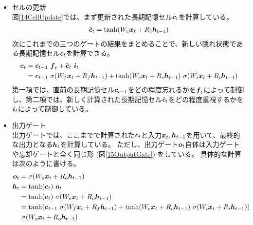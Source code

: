 \begin{itemize}
  \item セルの更新\\
  図\ref{14CellUpdate}では、まず更新された長期記憶セル$\tilde{{\mbox{\boldmath{$c$}}}}_t$を計算している。
\begin{equation}
 \begin{split}
  \tilde{{\mbox{\boldmath{$c$}}}}_t = \tanh (W_c {\mbox{\boldmath{$x$}}}_t + R_c {\mbox{\boldmath{$h$}}}_{t-1})
 \end{split}
\end{equation} 
  次にこれまでの三つのゲートの結果をまとめることで、新しい隠れ状態である長期記憶セル${\mbox{\boldmath{$c$}}}_{t}$を計算できる。
\begin{equation}
 \begin{split}
  {\mbox{\boldmath{$c$}}}_{t} 
  &= {\mbox{\boldmath{$c$}}}_{t-1} \  {\mbox{\boldmath{$f$}}}_{t} + \tilde{\mbox{\boldmath{$c$}}}_{t}\ {\mbox{\boldmath{$i$}}}_{t}\\
  &= {\mbox{\boldmath{$c$}}}_{t-1} \  \sigma (W_f {\mbox{\boldmath{$x$}}}_t + R_f {\mbox{\boldmath{$h$}}}_{t-1}) 
  + \tanh (W_c {\mbox{\boldmath{$x$}}}_t + R_c {\mbox{\boldmath{$h$}}}_{t-1}) \  \sigma (W_i {\mbox{\boldmath{$x$}}}_t + R_i {\mbox{\boldmath{$h$}}}_{t-1})
 \end{split}
\end{equation}
  第一項では、直前の長期記憶セル${\mbox{\boldmath{$c$}}}_{t-1}$をどの程度忘れるかを${\mbox{\boldmath{$f$}}}_{t}$によって制御し、第二項では、新しく計算された長期記憶セル$\tilde{\mbox{\boldmath{$c$}}}_{t}$をどの程度重視するかを${\mbox{\boldmath{$i$}}}_{t}$によって制御している。
    
  \item 出力ゲート\\
  出力ゲートでは、ここまでで計算された${\mbox{\boldmath{$c$}}}_{t}$と入力${\mbox{\boldmath{$x$}}}_t, {\mbox{\boldmath{$h$}}}_{t-1}$を用いて、最終的な出力となる${\mbox{\boldmath{$h$}}}_{t}$を計算している。
  ただし、出力ゲート${\mbox{\boldmath{$o$}}}_{t}$自体は入力ゲートや忘却ゲートと全く同じ形 (図\ref{15OutputGate}) をしている。
  具体的な計算は次のように書ける。
\begin{equation}
 \begin{split}
  {\mbox{\boldmath{$o$}}}_{t} 
  &= \sigma (W_o {\mbox{\boldmath{$x$}}}_t + R_o {\mbox{\boldmath{$h$}}}_{t-1})\\
  {\mbox{\boldmath{$h$}}}_{t} 
  &= \tanh({\mbox{\boldmath{$c$}}}_{t}) \  {\mbox{\boldmath{$o$}}}_{t}\\
  &= \tanh({\mbox{\boldmath{$c$}}}_{t}) \  \sigma (W_o {\mbox{\boldmath{$x$}}}_t + R_o {\mbox{\boldmath{$h$}}}_{t-1})\\
  &= \tanh({\mbox{\boldmath{$c$}}}_{t-1} \  \sigma (W_f {\mbox{\boldmath{$x$}}}_t + R_f {\mbox{\boldmath{$h$}}}_{t-1}) 
  + \tanh (W_c {\mbox{\boldmath{$x$}}}_t + R_c {\mbox{\boldmath{$h$}}}_{t-1}) \  \sigma (W_i {\mbox{\boldmath{$x$}}}_t + R_i {\mbox{\boldmath{$h$}}}_{t-1})) \\
  &\  \sigma (W_o {\mbox{\boldmath{$x$}}}_t + R_o {\mbox{\boldmath{$h$}}}_{t-1})
 \end{split}
\end{equation}
\end{itemize}

